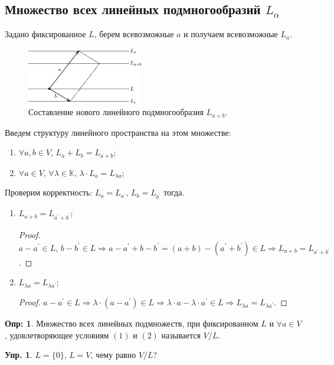\documentclass[12pt]{article}
\theoremstyle{definition}
\newtheorem{defn}{Опр:}
\newtheorem{exrc}{Упр.}
\begin{document}
\subsection*{Множество всех линейных подмногообразий $L_\alpha$}
Задано фиксированное $L$, берем всевозможные $a$ и получаем всевозможные $L_a$.
\begin{figure}[H]
	\centering
	\includegraphics[width=0.45\textwidth]{1_3.eps}
	\caption{Составление нового линейного подмногообразия $L_{a + b}$.}
	\label{1_3}
\end{figure}
Введем структуру линейного пространства на этом множестве:
\begin{enumerate}[label={(\arabic*)}]
	\item $\forall a,b \in V, \, L_a + L_b = L_{a+b}$;
	\item $\forall a \in V, \, \forall \lambda \in \mathbb{K},\, \lambda{\cdot}L_a = L_{\lambda a}$;
\end{enumerate}
Проверим корректность: $L_a = L_{a^\prime}, \, L_b = L_{b^\prime}$ тогда.
\begin{enumerate}[label={(\arabic*)}]
	\item $L_{a+b} = L_{a^\prime + b^\prime}$;
	\begin{proof} 
			$a - a^\prime \in L, \, b - b^\prime \in L \Rightarrow a - a^\prime + b - b^\prime =(a+b) - (a^\prime + b^\prime) \in L \Rightarrow  L_{a+b} = L_{a^\prime + b^\prime}$. 
	\end{proof}
	\item $L_{\lambda a} = L_{\lambda a^\prime}$;
	\begin{proof}
		$a - a^\prime \in L \Rightarrow \lambda{\cdot}(a-a^\prime) \in L \Rightarrow \lambda{\cdot}a - \lambda{\cdot}a^\prime \in L \Rightarrow L_{\lambda a} = L_{\lambda a^\prime}$.
	\end{proof}
\end{enumerate}

\begin{defn}
	Множество всех линейных подмножеств, при фиксированном $L$ и $\forall a \in V$, удовлетворяющее условиям $(1)$ и $(2)$ называется  $V/L$.
\end{defn}

\begin{exrc}
	$L = \{0\}, \, L = V$, чему равно $V/L$?
\end{exrc}
\end{document}
